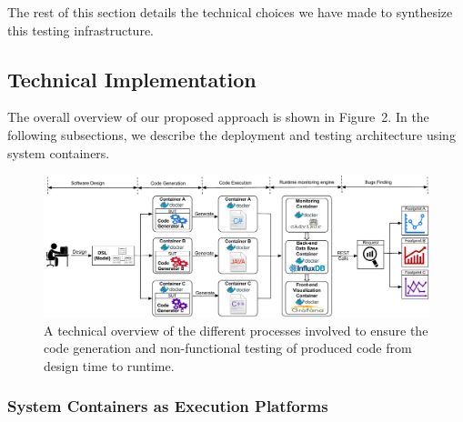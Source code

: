 The rest of this section details the technical choices we have made to synthesize this testing infrastructure.

\subsection{Technical Implementation}

The overall overview of our proposed approach is shown in Figure~2. In the following subsections, we describe the deployment and testing architecture using system containers.


\begin{figure}[!h]
	\center
	\includegraphics[width=0.95\linewidth]{Ressources/background2.pdf}
	\caption{A technical overview of the different processes involved to ensure the code generation and non-functional testing of produced code from design time to runtime.}
\end{figure}


\subsubsection{System Containers as Execution Platforms}





